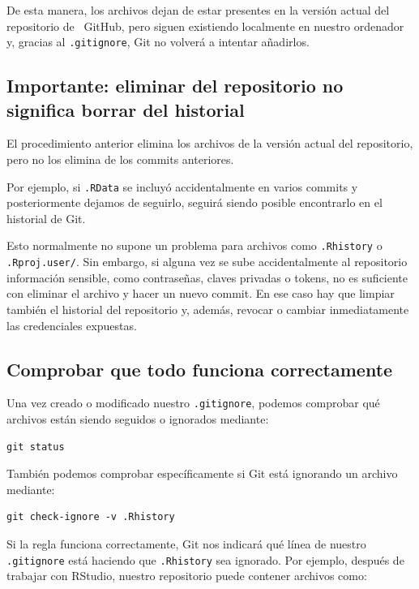 \documentclass[11pt,a4paper]{article}
\newcommand{\GitHub}{\faIcon{github}~\!GitHub}
\theoremstyle{exercise}
\begin{document}
De esta manera, los archivos dejan de estar presentes en la versión actual del repositorio de \GitHub, pero siguen existiendo localmente en nuestro ordenador y, gracias al \texttt{.gitignore}, Git no volverá a intentar añadirlos.



\subsection{Importante: eliminar del repositorio no significa borrar del historial}

El procedimiento anterior elimina los archivos de la versión actual del repositorio, pero no los elimina de los commits anteriores.

Por ejemplo, si \texttt{.RData} se incluyó accidentalmente en varios commits y posteriormente dejamos de seguirlo, seguirá siendo posible encontrarlo en el historial de Git.

Esto normalmente no supone un problema para archivos como \texttt{.Rhistory} o \texttt{.Rproj.user/}. Sin embargo, si alguna vez se sube accidentalmente al repositorio información sensible, como contraseñas, claves privadas o tokens, no es suficiente con eliminar el archivo y hacer un nuevo commit. En ese caso hay que limpiar también el historial del repositorio y, además, revocar o cambiar inmediatamente las credenciales expuestas.



\subsection{Comprobar que todo funciona correctamente}

Una vez creado o modificado nuestro \texttt{.gitignore}, podemos comprobar qué archivos están siendo seguidos o ignorados mediante:

\begin{lstlisting}[style=mdstyle]
git status
\end{lstlisting}

También podemos comprobar específicamente si Git está ignorando un archivo mediante:

\begin{lstlisting}[style=mdstyle]
git check-ignore -v .Rhistory
\end{lstlisting}

\noindent Si la regla funciona correctamente, Git nos indicará qué línea de nuestro \texttt{.gitignore} está haciendo que \texttt{.Rhistory} sea ignorado. Por ejemplo, después de trabajar con RStudio, nuestro repositorio puede contener archivos como:
\end{document}
